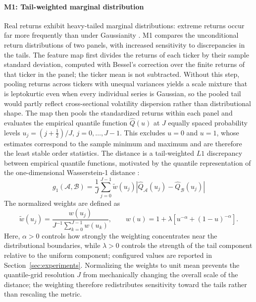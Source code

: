 \paragraph{M1: Tail-weighted marginal distribution}
Real returns exhibit heavy-tailed marginal distributions: extreme
returns occur far more frequently than under Gaussianity
\citep{cont2001empirical}.
M1 compares the unconditional return distributions of two panels, with
increased sensitivity to discrepancies in the tails.
The feature map first divides the returns of each ticker by their sample
standard deviation, computed with Bessel's correction over the finite returns of
that ticker in the panel; the ticker mean is not subtracted.
Without this step, pooling returns across tickers with unequal variances yields a
scale mixture that is leptokurtic even when every individual series is Gaussian,
so the pooled tail would partly reflect cross-sectional volatility dispersion
rather than distributional shape.
The map then pools the standardized returns within each panel and evaluates the
empirical quantile function $\hat{Q}(u)$ at $J$ equally spaced
probability levels
$u_j=(j+\tfrac{1}{2})/J$, $j=0,\ldots,J-1$.
This excludes $u=0$ and $u=1$, whose estimates correspond to the
sample minimum and maximum and are therefore the least stable order
statistics.
The distance is a tail-weighted $L1$ discrepancy between empirical
quantile functions, motivated by the quantile representation of the
one-dimensional Wasserstein-1 distance
\citep{villani2009optimal}:
\begin{equation}
g_1(\mathcal{A},\mathcal{B})
= \frac{1}{J}\sum_{j=0}^{J-1}
\widetilde{w}(u_j)
\left|
\hat{Q}_{\mathcal{A}}(u_j)
-
\hat{Q}_{\mathcal{B}}(u_j)
\right|
\label{eq:m1}
\end{equation}
The normalized weights are defined as
\begin{equation}
\widetilde{w}(u_j)
= \frac{w(u_j)}
{J^{-1}\sum_{k=0}^{J-1}w(u_k)},
\qquad
w(u)
= 1+\lambda
\left[
u^{-\alpha}+(1-u)^{-\alpha}
\right].
\label{eq:m1_weights}
\end{equation}
Here, $\alpha>0$ controls how strongly the weighting concentrates near
the distributional boundaries, while $\lambda>0$ controls the strength
of the tail component relative to the uniform component; configured
values are reported in Section~\ref{sec:experiments}.
Normalizing the weights to unit mean prevents the quantile-grid
resolution $J$ from mechanically changing the overall scale of the
distance; the weighting therefore redistributes sensitivity toward the
tails rather than rescaling the metric.

